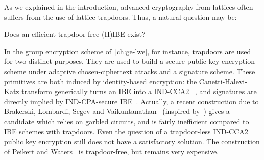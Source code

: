 As we explained in the introduction, advanced cryptography from lattices often suffers from the use of lattice trapdoors.
Thus, a natural question may be:

\begin{question}
  Does an efficient trapdoor-free \textsf{(H)IBE} exist?
\end{question}

In the group encryption scheme of~\cref{ch:ge-lwe}, for instance, trapdoors are used for two distinct purposes.
They are used to build a secure public-key encryption scheme under adaptive chosen-ciphertext attacks and a signature scheme.
These primitives are both induced by identity-based encryption: the Canetti-Halevi-Katz transform generically turns an \textsf{IBE} into a \textsf{IND-CCA2} \PKE~\cite{CHK04}, and signatures are directly implied by \textsf{IND-CPA-}secure \textsf{IBE}~\cite{BF01,BLS01}.
Actually, a recent construction due to Brakerski, Lombardi, Segev and Vaikuntanathan~\cite{BLSV18} (inspired by~\cite{DG17a}) gives a candidate which relies on garbled circuits, and is fairly inefficient compared to \textsf{IBE} schemes with trapdoors.
Even the question of a trapdoor-less \textsf{IND-CCA2} public key encryption still does not have a satisfactory solution. 
The construction of Peikert and Waters~\cite{PW08} is trapdoor-free, but remains very expensive.

\begin{comment}
\begin{question}
  Can we achieve better security proofs for cryptographic schemes?
\end{question}

Our work during this thesis also focuses on the security proofs of cryptographic schemes.
As explained in~\cref{ch:proofs}, it is important to rely on simple assumptions to prove strong security notions.
Given recent advances in cryptographic proofs~\cite{Hof16,KMP16,Hof17}, it is now possible to attain stronger security notions than what was claimed before~\cite{DSYC18}.
Another line of work targets the quality of the reduction, aiming for \textit{tight security}~\cite{GHKW16,AHN+17,LJYP14,LPJY15,LSSS17}.
This improves the understanding of the links between cryptographic schemes and hardness assumptions, leading to more reliable constructions.
\end{comment}

